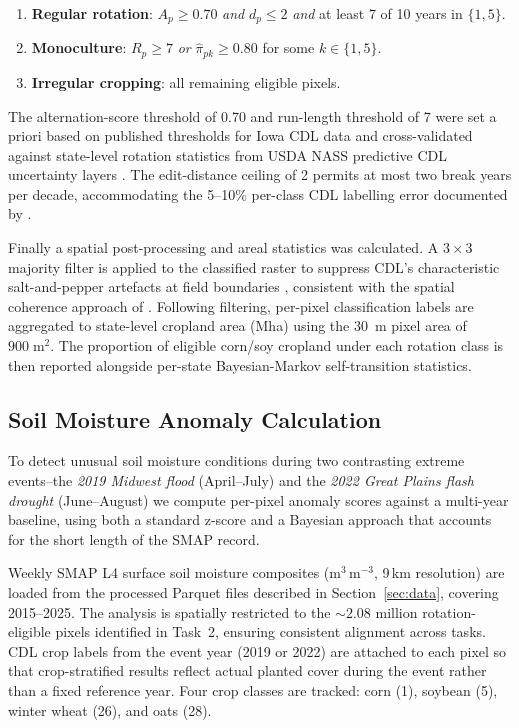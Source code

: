 \documentclass{article}
\begin{document}
\begin{enumerate}[label=(\roman*)]
    \item \textbf{Regular rotation}: $A_p \geq 0.70$ \emph{and} $d_p \leq 2$
          \emph{and} at least 7 of 10 years in $\{1,5\}$.
    \item \textbf{Monoculture}: $R_p \geq 7$ \emph{or}
          $\hat{\pi}_{pk} \geq 0.80$ for some $k \in \{1,5\}$.
    \item \textbf{Irregular cropping}: all remaining eligible pixels.
\end{enumerate}

The alternation-score threshold of 0.70 and run-length threshold of 7 were set
a priori based on published thresholds for Iowa CDL data \citep{stern2012iowa}
and cross-validated against state-level rotation statistics from USDA NASS
predictive CDL uncertainty layers \citep{nass_markov}.
The edit-distance ceiling of 2 permits at most two break years per decade,
accommodating the 5--10\% per-class CDL labelling error documented by
\citet{cdl_cropscape}.

Finally a spatial post-processing and areal statistics was calculated.
A $3{\times}3$ majority filter is applied to the classified raster to suppress
CDL's characteristic salt-and-pepper artefacts at field boundaries
\citep{wardlow2007modis}, consistent with the spatial coherence approach of
\citet{nandan2026rotation}.
Following filtering, per-pixel classification labels are aggregated to state-level
cropland area (Mha) using the 30~m pixel area of $900\;\mathrm{m}^2$.
The proportion of eligible corn/soy cropland under each rotation class is then
reported alongside per-state Bayesian-Markov self-transition statistics.

\subsection{Soil Moisture Anomaly Calculation}
\label{sec:anomaly}
To detect unusual soil moisture conditions during two contrasting extreme events--the \textit{2019 Midwest flood} (April--July) and the \textit{2022 Great Plains flash drought} (June--August) we compute per-pixel anomaly scores against a multi-year baseline, using both a standard z-score and a Bayesian approach that accounts for the short length of the SMAP record.

Weekly SMAP L4 surface soil moisture composites (m$^3$\,m$^{-3}$, 9\,km resolution) are loaded from the processed Parquet files described in Section~\ref{sec:data}, covering 2015--2025. The analysis is spatially restricted to the ${\sim}2.08$ million rotation-eligible pixels identified in Task~2, ensuring consistent alignment across tasks. CDL crop labels from the event year (2019 or 2022) are attached to each pixel so that crop-stratified results reflect actual planted cover during the event rather than a fixed reference year. Four crop classes are tracked: corn (1), soybean (5), winter wheat (26), and oats (28).
\end{document}
